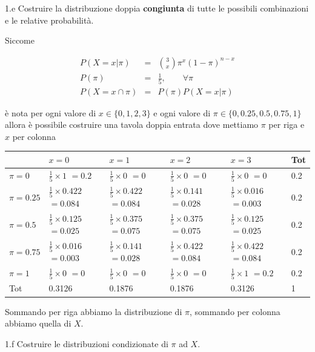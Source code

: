 \documentclass[
  11pt,
]{book}
\theoremstyle{mytheoremstyle}
\theoremstyle{mydefstyle}
\newenvironment{sol}
  {
  \begin{tcolorbox}[enhanced,breakable,arc=0.1mm,boxrule=1pt,colback=white,colframe=iblue,
  title=\bf \fontfamily{lmss}\selectfont \hspace{.5 cm} Soluzione,drop fuzzy shadow]

}{
\end{tcolorbox}
  }
\begin{document}
1.e Costruire la distribuzione doppia \textbf{congiunta} di tutte le possibili combinazioni e le relative probabilità.

\begin{sol}
Siccome

\begin{eqnarray*}
  P(X=x|\pi) &=&  \binom{3}{x}\pi^x(1-\pi)^{n-x}\\
  P(\pi)      &=& \frac 15,\qquad \forall \pi\\
  P(X=x\cap\pi) &=& P(\pi)P(X=x|\pi)
\end{eqnarray*}

è nota per ogni valore di \(x\in\{0,1,2,3\}\) e ogni valore di \(\pi\in\{0,0.25,0.5,0.75,1\}\) allora è possibile costruire una
tavola doppia entrata dove mettiamo \(\pi\) per riga e \(x\) per colonna

\begin{tabular}{llllll}
\toprule
  & $x=0$ & $x=1$ & $x=2$ & $x=3$ & Tot\\
\midrule
$\pi=0$ & $\frac 15\times1$ $=0.2$ & $\frac 15\times0$ $=0$ & $\frac 15\times0$ $=0$ & $\frac 15\times0$ $=0$ & 0.2\\
$\pi=0.25$ & $\frac 15\times0.422$ $=0.084$ & $\frac 15\times0.422$ $=0.084$ & $\frac 15\times0.141$ $=0.028$ & $\frac 15\times0.016$ $=0.003$ & 0.2\\
$\pi=0.5$ & $\frac 15\times0.125$ $=0.025$ & $\frac 15\times0.375$ $=0.075$ & $\frac 15\times0.375$ $=0.075$ & $\frac 15\times0.125$ $=0.025$ & 0.2\\
$\pi=0.75$ & $\frac 15\times0.016$ $=0.003$ & $\frac 15\times0.141$ $=0.028$ & $\frac 15\times0.422$ $=0.084$ & $\frac 15\times0.422$ $=0.084$ & 0.2\\
$\pi=1$ & $\frac 15\times0$ $=0$ & $\frac 15\times0$ $=0$ & $\frac 15\times0$ $=0$ & $\frac 15\times1$ $=0.2$ & 0.2\\
Tot & 0.3126 & 0.1876 & 0.1876 & 0.3126 & 1\\
\bottomrule
\end{tabular}

Sommando per riga abbiamo la distribuzione di \(\pi\), sommando per colonna abbiamo
quella di \(X\).

\end{sol}

1.f Costruire le distribuzioni condizionate di \(\pi\) ad \(X\).
\end{document}
